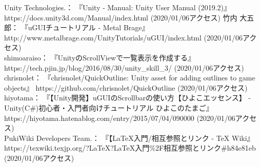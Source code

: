 \documentclass[12pt]{jarticle}
\begin{document}
\begin{thebibliography}{99}
 Unity Technologies.： 『Unity - Manual: Unity User Manual (2019.2)』 https://docs.unity3d.com/Manual/index.html (2020/01/06アクセス)
 竹内 大五郎： 『uGUIチュートリアル - Metal Brage』 http://www.metalbrage.com/UnityTutorials/uGUI/index.html (2020/01/06アクセス) \\
 shimoaraiso： 『UnityのScrollViewで一覧表示を作成する』 https://tech.pjin.jp/blog/2016/08/30/unity\_skill\_3/ (2020/01/06アクセス) \\
 chrisnolet： 『chrisnolet/QuickOutline: Unity asset for adding outlines to game objects』 https://github.com/chrisnolet/QuickOutline (2020/01/06アクセス) \\
 hiyotama： 『【Unity開発】uGUIのScrollbarの使い方【ひよこエッセンス】 - Unity(C\#)初心者・入門者向けチュートリアル ひよこのたまご』 https://hiyotama.hatenablog.com/entry/2015/07/04/090000 (2020/01/06アクセス) \\
 PukiWiki Developers Team.： 『【LaTeX入門/相互参照とリンク - TeX Wiki』 https://texwiki.texjp.org/?LaTeX?LaTeX入門\%2F相互参照とリンク\#h84e81eb (2020/01/06アクセス) \\
\end{thebibliography}
\end{document}
